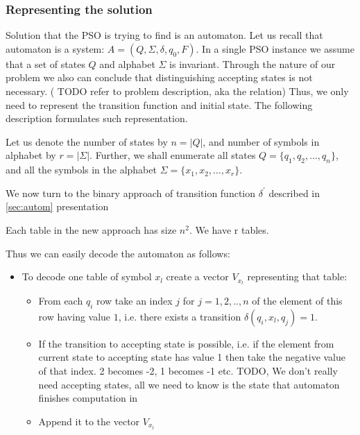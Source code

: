 \documentclass[runningheads,a4paper]{llncs}
\begin{document}
\subsubsection{Representing the solution}

Solution that the PSO is trying to find is an automaton. Let us recall that automaton is a system: $A = (Q, \Sigma, \delta, q_0, F)$. In a single PSO instance we assume that a set of states $Q$ and alphabet $\Sigma$ is invariant. Through the nature of our problem we also can conclude that distinguishing accepting states is not necessary. ({\color{red} TODO refer to problem description, aka the relation})
Thus, we only need to represent the transition function and initial state. The following description formulates such representation.

Let us denote the number of states by $n = |Q|$, and number of symbols in alphabet by $r = |\Sigma|$. Further, we shall enumerate all states 	$Q = \{q_1, q_2, \ldots, q_n\}$, and all the symbols in the alphabet 	$\Sigma = \{x_1, x_2, \ldots, x_r\}$.

We now turn to the binary approach of transition function $\delta^{'}$ described in \ref{sec:autom} presentation 




Each table in the new approach has size $n^2$. We have r tables.

Thus we can easily decode the automaton as follows:
\begin{itemize}
\item To decode one table of symbol $x_l$ create a vector $V_{x_l}$ representing that table:
	\begin{itemize}
		\item From each $q_i$ row take an index $j$ for $j = 1,2,..,n$ of the element of this row having value $1$, i.e. there exists a transition $\delta(q_i, x_l, q_j) = 1$.
		\item If the transition to accepting state is possible, i.e. if the element from current state to accepting state has value 1 then take the negative value of that index. 2 becomes -2, 1 becomes -1 etc. {\color{red} TODO, We don't really need accepting states, all we need to know is the state that automaton finishes computation in}
		\item Append it to the vector $V_{x_l}$
	\end{itemize}
\end{itemize}
\end{document}

